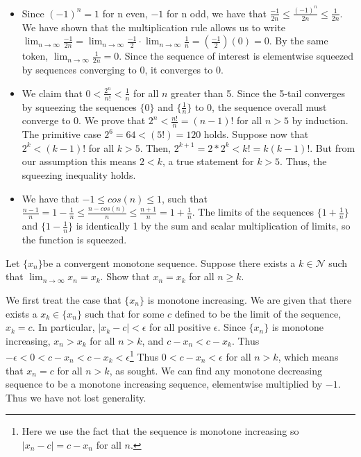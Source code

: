 \documentclass[11 pt]{article}
\begin{document}
\begin{solution}
	\begin{itemize}
	\item Since $(-1)^n=1$ for n even, $-1$ for n odd, we have that $\frac{-1}{2n}\leq\frac{(-1)^n}{2n}\leq\frac{1}{2n}$.\\
		We have shown that the multiplication rule allows us to write\\
		$\lim_{n\to \infty}\frac{-1}{2n}=\lim_{n \to \infty}\frac{-1}{2}\cdot\lim_{n\to\infty}\frac{1}{n}= (\frac{-1}{2})(0)=0$. By the same token, $\lim_{n \to \infty}\frac{1}{2n}=0$. Since the sequence of interest is elementwise squeezed by sequences converging to 0, it converges to 0.
	\item We claim that $0<\frac{2^n}{n!}<\frac{1}{n}$ for all $n$ greater than 5. Since the 5-tail converges by squeezing the sequences $\{0\}$ and $\{\frac{1}{n}\}$ to 0, the sequence overall must converge to 0.
	We prove that $2^n<\frac{n!}{n}=(n-1)!$ for all $n>5$ by induction. The primitive case  $2^6=64<(5!)=120$ holds.
	 Suppose now that $2^k<(k-1)!$ for all $k>5$. Then, $2^{k+1}=2*2^k<k!=k(k-1)!$. But from our assumption this means $2<k$, a true statement for $k>5$. Thus, the squeezing inequality holds.
 \item We have that $-1\leq cos(n)\leq1$, such that $\frac{n-1}{n}=1-\frac{1}{n}\leq\frac{n-cos(n)}{n}\leq\frac{n+1}{n}=1+\frac{1}{n}$. The limits of the sequences $\{1+\frac{1}{n}\}$ and $\{1-\frac{1}{n}\}$ is identically 1 by the sum and scalar multiplication of limits, so the function is squeezed.
	\end{itemize}
\end{solution}
\pagebreak
\begin{problem}
Let $\{x_n\}$be a convergent monotone sequence. Suppose there exists a $k\in\mathcal{N}$ such that $\lim_{n\to\infty}x_n=x_k$. Show that $x_n=x_k$ for all $n\geq k$.
\end{problem}
\begin{solution}
We first treat the case that $\{x_n\}$ is monotone increasing.
We are given that there exists a $x_k\in\{x_n\}$ such that for some $c$ defined to be the limit of the sequence, $x_k=c$.
	In particular, $|x_k-c|<\epsilon$ for all positive  $\epsilon$. Since  $\{x_n\}$ is monotone increasing, $x_n>x_k$ for all $n>k$, and $c-x_n<c-x_k$. Thus\\
	$-\epsilon<0<c-x_n<c-x_k<\epsilon$\footnote{Here we use the fact that the sequence is monotone increasing so $|x_n-c|=c-x_n$ for all $n$.} Thus  $0<c-x_n<\epsilon$ for all $n>k$, which  means that $x_n=c$ for all $n>k$, as sought.
	We can find any monotone decreasing sequence to be a monotone increasing sequence, elementwise multiplied by $-1$. Thus we have not lost generality.
\end{solution}
\end{document}

